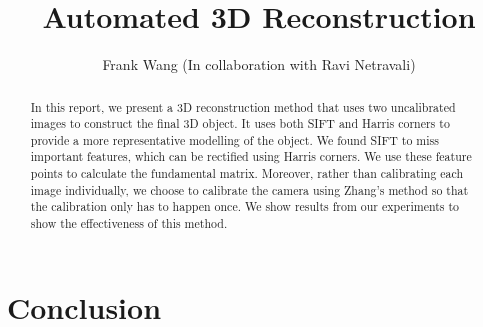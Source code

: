 \documentclass[10pt,twocolumn,letterpaper]{article}
\begin{document}
\title{Automated 3D Reconstruction}

\author{Frank Wang (In collaboration with Ravi Netravali) \\
}

\maketitle

\begin{abstract}
In this report, we present a 3D reconstruction method that uses two uncalibrated images to construct the 
final 3D object. It uses both SIFT and 
Harris corners to provide a more representative modelling of the object. We found SIFT to 
miss important features, which can be rectified using Harris corners. We use these feature points to
calculate the fundamental matrix.  Moreover, rather than calibrating each image individually, we choose to calibrate the camera
using Zhang's method so that the calibration only has to happen once. We show results from our experiments to show the effectiveness
of this method.
\end{abstract}

















%

\section{Conclusion}

\end{document}
